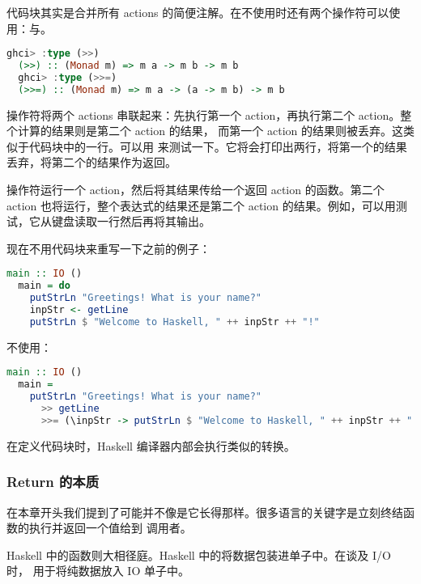 \documentclass[./main.tex]{subfiles}
\begin{document}
代码块其实是合并所有 actions 的简便注解。在不使用时还有两个操作符可以使用：\acode{>>}与\acode{>>=}。

\begin{lstlisting}[language=Haskell]
  ghci> :type (>>)
  (>>) :: (Monad m) => m a -> m b -> m b
  ghci> :type (>>=)
  (>>=) :: (Monad m) => m a -> (a -> m b) -> m b
\end{lstlisting}

\acode{>>}操作符将两个 actions 串联起来：先执行第一个 action，再执行第二个 action。整个计算的结果则是第二个 action 的结果，
而第一个 action 的结果则被丢弃。这类似于代码块中的一行。可以用
来测试一下。它将会打印出两行，将第一个的结果丢弃，将第二个的结果作为返回。

\acode{>>=}操作符运行一个 action，然后将其结果传给一个返回 action 的函数。第二个 action 也将运行，整个表达式的结果还是第二个
action 的结果。例如，可以用测试，它从键盘读取一行然后再将其输出。

现在不用代码块来重写一下之前的例子：

\begin{lstlisting}[language=Haskell]
  main :: IO ()
  main = do
    putStrLn "Greetings! What is your name?"
    inpStr <- getLine
    putStrLn $ "Welcome to Haskell, " ++ inpStr ++ "!"
\end{lstlisting}

不使用：

\begin{lstlisting}[language=Haskell]
  main :: IO ()
  main =
    putStrLn "Greetings! What is your name?"
      >> getLine
      >>= (\inpStr -> putStrLn $ "Welcome to Haskell, " ++ inpStr ++ "!")
\end{lstlisting}

在定义代码块时，Haskell 编译器内部会执行类似的转换。

\subsubsection*{Return 的本质}

在本章开头我们提到了可能并不像是它长得那样。很多语言的关键字是立刻终结函数的执行并返回一个值给到
调用者。

Haskell 中的函数则大相径庭。Haskell 中的将数据包装进单子中。在谈及 I/O 时，
用于将纯数据放入 IO 单子中。
\end{document}
